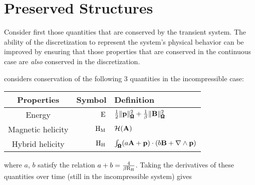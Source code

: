 \section{Preserved Structures}
    
    Consider first those quantities that are conserved by the transient system. The ability of the discretization to represent the system's physical behavior can be improved by ensuring that those properties that are conserved in the continuous case are \emph{also} conserved in the discretization. \BA{[Ref, ...]}
    
    \cite{LHF22} considers conservation of the following 3 quantities in the incompressible case: 
    \begin{center}\begin{tabular}{ c | r l }
        Properties  &  Symbol  &  Definition  \\
        \hline\hline
        Energy  &  $\mathrm{E}$  &  $\frac{1}{2}\|\mathbf{p}\|_{\pmb{\mathsf{\Omega}}}^{2} + \frac{1}{\beta}\|\mathbf{B}\|_{\pmb{\mathsf{\Omega}}}^{2}$  \\
        Magnetic helicity  &  $\mathrm{H}_{\mathrm{M}}$  &  $\mathcal{H}(\mathbf{A})$  \\
        Hybrid helicity  &  $\mathrm{H}_{\mathrm{H}}$  &  $\int_{\pmb{\mathsf{\Omega}}}(a\mathbf{A} + \mathbf{p})\cdot(b\mathbf{B} + \nabla\wedge\mathbf{p})$
    \end{tabular}\end{center}
    where $a$, $b$ satisfy the relation $a + b  =  \frac{4}{\beta\mathrm{R}_{\mathrm{H}}}$.  Taking the derivatives of these quantities over time (still in the incompressible system) gives 
